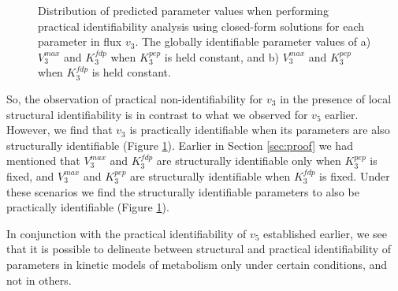\documentclass[10pt]{article}
\begin{document}
	\begin{figure}[!tbhp]
		\caption{Distribution of predicted parameter values when performing practical identifiability analysis using closed-form solutions for each parameter in flux $v_3$. The globally identifiable parameter values of a)  $V_3^{max}$ and $K_3^{fdp}$ when $K_3^{pep}$ is held constant, and b) $V_3^{max}$ and $K_3^{pep}$ when $K_3^{fdp}$ is held constant.}\label{fig:v3_var_ck_values}
	\end{figure}	

	So, the observation of practical non-identifiability for $v_3$ in the presence of local structural identifiability is in contrast to what we observed for $v_5$ earlier. However, we find that $v_3$ is practically identifiable when its parameters are also structurally identifiable (Figure \ref{fig:v3_var_ck_values}). Earlier in Section \ref{sec:proof} we had mentioned that $V_3^{max}$ and $K_3^{fdp}$ are structurally identifiable only when $K_3^{pep}$ is fixed, and $V_3^{max}$ and $K_3^{pep}$ are structurally identifiable when $K_3^{fdp}$ is fixed. Under these scenarios we find the structurally identifiable parameters to also be practically identifiable (Figure \ref{fig:v3_var_ck_values}).	
	
	In conjunction with the practical identifiability of $v_5$ established earlier, we see that it is possible to delineate between structural and practical identifiability of parameters in kinetic models of metabolism only under certain conditions, and not in others.
	
\end{document}
